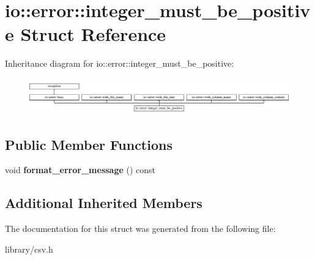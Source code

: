 \hypertarget{structio_1_1error_1_1integer__must__be__positive}{}\section{io\+:\+:error\+:\+:integer\+\_\+must\+\_\+be\+\_\+positive Struct Reference}
\label{structio_1_1error_1_1integer__must__be__positive}
Inheritance diagram for io\+:\+:error\+:\+:integer\+\_\+must\+\_\+be\+\_\+positive\+:\begin{figure}[H]
\begin{center}
\leavevmode
\includegraphics[height=1.577465cm]{structio_1_1error_1_1integer__must__be__positive}
\end{center}
\end{figure}
\subsection*{Public Member Functions}
\begin{DoxyCompactItemize}
\item 
\mbox{\label{structio_1_1error_1_1integer__must__be__positive_af6daaa02512141958a3eafd0c07232ef}} 
void {\bfseries format\+\_\+error\+\_\+message} () const
\end{DoxyCompactItemize}
\subsection*{Additional Inherited Members}


The documentation for this struct was generated from the following file\+:\begin{DoxyCompactItemize}
\item 
library/csv.\+h\end{DoxyCompactItemize}
